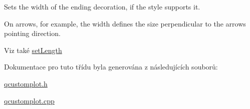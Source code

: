 Sets the width of the ending decoration, if the style supports it. 

On arrows, for example, the width defines the size perpendicular to the arrow\textquotesingle{}s pointing direction.

\begin{DoxySeeAlso}{Viz také}
\hyperlink{classQCPLineEnding_ae36fa01763751cd64b7f56c3507e935a}{set\+Length} 
\end{DoxySeeAlso}


Dokumentace pro tuto třídu byla generována z následujících souborů\+:\begin{DoxyCompactItemize}
\item 
\hyperlink{qcustomplot_8h}{qcustomplot.\+h}\item 
\hyperlink{qcustomplot_8cpp}{qcustomplot.\+cpp}\end{DoxyCompactItemize}
